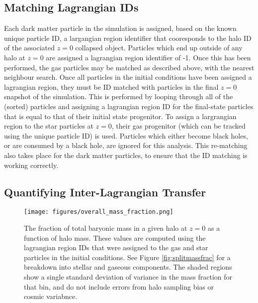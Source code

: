 
\subsection{Matching Lagrangian IDs}

Each dark matter particle in the simulation is assigned, based on the known unique particle ID, a largangian region identifier that cooresponds to the halo ID of the associated $z=0$ collapsed object. Particles which end up outside of any halo at $z=0$ are assigned a lagrangian region identifier of -1. Once this has been performed, the gas particles may be matched as described above, with the nearest neighbour search. Once all particles in the initial conditions have been assigned a lagrangian region, they must be ID matched with particles in the final $z=0$ snapshot of the simulation. This is performed by looping through all of the (sorted) particles and assigning a lagrangian region ID for the final-state particles that is equal to that of their initial state progenitor. To assign a largrangian region to the star particles at $z=0$, their gas progenitor (which can be tracked using the unique particle ID) is used. Particles which either become black holes, or are consumed by a black hole, are ignored for this analysis. This re-matching also takes place for the dark matter particles, to ensure that the ID matching is working correctly.


\subsection{Quantifying Inter-Lagrangian Transfer}

\begin{figure}
    \centering
    \texttt{[image: figures/overall\_mass\_fraction.png]}
    \caption{The fraction of total baryonic mass in a given halo at $z=0$ as a function of halo mass. These values are computed using the lagrangian region IDs that were assigned to the gas and star particles in the initial conditions. See Figure \ref{fig:splitmassfrac} for a breakdown into stellar and gaseous components. The shaded regions show a single standard deviation of variance in the mass fraction for that bin, and do not include errors from halo sampling bias or cosmic variabnce. }
    \label{fig:massfrac}
\end{figure}

